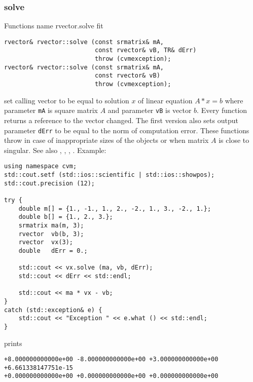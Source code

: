 \subsubsection{solve}
Functions%
\pdfdest name {rvector.solve} fit
\begin{verbatim}
rvector& rvector::solve (const srmatrix& mA,
                         const rvector& vB, TR& dErr)
                         throw (cvmexception);
rvector& rvector::solve (const srmatrix& mA,
                         const rvector& vB)
                         throw (cvmexception);
\end{verbatim}
set calling vector to be equal to solution $x$ of  linear equation
$A*x=b$ where parameter \verb"mA" is  square matrix $A$
and parameter \verb"vB" is  vector $b$.
Every function returns a reference to the vector changed.
The first version also sets output parameter \verb"dErr" to be equal
to the norm of computation error.
These functions throw 
in case of inappropriate sizes
of the objects or when  matrix $A$ is close to singular.
See also , 
, , .
Example:
\begin{Verbatim}
using namespace cvm;
std::cout.setf (std::ios::scientific | std::ios::showpos);
std::cout.precision (12);

try {
    double m[] = {1., -1., 1., 2., -2., 1., 3., -2., 1.};
    double b[] = {1., 2., 3.};
    srmatrix ma(m, 3);
    rvector  vb(b, 3);
    rvector  vx(3);
    double   dErr = 0.;

    std::cout << vx.solve (ma, vb, dErr);
    std::cout << dErr << std::endl;

    std::cout << ma * vx - vb;
}
catch (std::exception& e) {
    std::cout << "Exception " << e.what () << std::endl;
}
\end{Verbatim}
prints
\begin{Verbatim}
+8.000000000000e+00 -8.000000000000e+00 +3.000000000000e+00
+6.661338147751e-15
+0.000000000000e+00 +0.000000000000e+00 +0.000000000000e+00
\end{Verbatim}
\newpage



